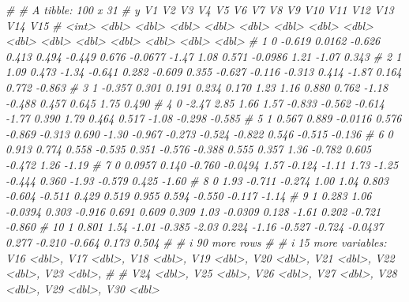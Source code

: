 \documentclass[
]{article}
\newenvironment{Shaded}{\begin{snugshade}}{\end{snugshade}}
\newcommand{\CommentTok}[1]{\textcolor[rgb]{0.56,0.35,0.01}{\textit{#1}}}
\begin{document}
\begin{Shaded}
\begin{Highlighting}[]
\CommentTok{\# \# A tibble: 100 x 31}
\CommentTok{\#        y      V1      V2      V3      V4     V5     V6     V7      V8     V9     V10    V11     V12    V13    V14    V15}
\CommentTok{\#    \textless{}int\textgreater{}   \textless{}dbl\textgreater{}   \textless{}dbl\textgreater{}   \textless{}dbl\textgreater{}   \textless{}dbl\textgreater{}  \textless{}dbl\textgreater{}  \textless{}dbl\textgreater{}  \textless{}dbl\textgreater{}   \textless{}dbl\textgreater{}  \textless{}dbl\textgreater{}   \textless{}dbl\textgreater{}  \textless{}dbl\textgreater{}   \textless{}dbl\textgreater{}  \textless{}dbl\textgreater{}  \textless{}dbl\textgreater{}  \textless{}dbl\textgreater{}}
\CommentTok{\#  1     0 {-}0.619   0.0162 {-}0.626   0.413   0.494 {-}0.449  0.676 {-}0.0677 {-}1.47   1.08    0.571 {-}0.0986  1.21  {-}1.07   0.343}
\CommentTok{\#  2     1  1.09    0.473  {-}1.34   {-}0.641   0.282 {-}0.609  0.355 {-}0.627  {-}0.116 {-}0.313   0.414 {-}1.87    0.164  0.772 {-}0.863}
\CommentTok{\#  3     1 {-}0.357   0.301   0.191   0.234   0.170  1.23   1.16   0.880   0.762 {-}1.18   {-}0.488  0.457   0.645  1.75   0.490}
\CommentTok{\#  4     0 {-}2.47    2.85    1.66    1.57   {-}0.833 {-}0.562 {-}0.614 {-}1.77    0.390  1.79    0.464  0.517  {-}1.08  {-}0.298 {-}0.585}
\CommentTok{\#  5     1  0.567   0.889  {-}0.0116  0.576  {-}0.869 {-}0.313  0.690 {-}1.30   {-}0.967 {-}0.273  {-}0.524 {-}0.822   0.546 {-}0.515 {-}0.136}
\CommentTok{\#  6     0  0.913   0.774   0.558  {-}0.535   0.351 {-}0.576 {-}0.388  0.555   0.357  1.36   {-}0.782  0.605  {-}0.472  1.26  {-}1.19 }
\CommentTok{\#  7     0  0.0957  0.140  {-}0.760  {-}0.0494  1.57  {-}0.124 {-}1.11   1.73   {-}1.25  {-}0.444   0.360 {-}1.93   {-}0.579  0.425 {-}1.60 }
\CommentTok{\#  8     0  1.93   {-}0.711  {-}0.274   1.00    1.04   0.803 {-}0.604 {-}0.511   0.429  0.519   0.955  0.594  {-}0.550 {-}0.117 {-}1.14 }
\CommentTok{\#  9     1  0.283   1.06   {-}0.0394  0.303  {-}0.916  0.691  0.609  0.309   1.03  {-}0.0309  0.128 {-}1.61    0.202 {-}0.721 {-}0.860}
\CommentTok{\# 10     1  0.801   1.54   {-}1.01   {-}0.385  {-}2.03   0.224 {-}1.16  {-}0.527  {-}0.724 {-}0.0437  0.277 {-}0.210  {-}0.664  0.173  0.504}
\CommentTok{\# \# i 90 more rows}
\CommentTok{\# \# i 15 more variables: V16 \textless{}dbl\textgreater{}, V17 \textless{}dbl\textgreater{}, V18 \textless{}dbl\textgreater{}, V19 \textless{}dbl\textgreater{}, V20 \textless{}dbl\textgreater{}, V21 \textless{}dbl\textgreater{}, V22 \textless{}dbl\textgreater{}, V23 \textless{}dbl\textgreater{},}
\CommentTok{\# \#   V24 \textless{}dbl\textgreater{}, V25 \textless{}dbl\textgreater{}, V26 \textless{}dbl\textgreater{}, V27 \textless{}dbl\textgreater{}, V28 \textless{}dbl\textgreater{}, V29 \textless{}dbl\textgreater{}, V30 \textless{}dbl\textgreater{}}

\end{Highlighting}
\end{Shaded}
\end{document}
